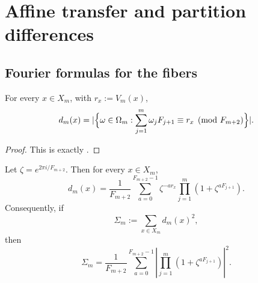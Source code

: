 \section{Affine transfer and partition differences}\label{sec:residue-affine}

\subsection{Fourier formulas for the fibers}

\begin{theorem}
\label{thm:residue-fibers}
For every \(x\in X_m\), with \(r_x:=V_m(x)\),
\[
  d_m(x)
  =
  \lvert \Bigl\{\omega\in\Omega_m:
  \sum_{j=1}^m\omega_jF_{j+1}\equiv r_x \pmod{F_{m+2}}\Bigr\} \rvert.
\]
\end{theorem}

\begin{proof}
This is exactly .
\end{proof}

\begin{theorem}
\label{thm:fourier-inversion}
Let \(\zeta=e^{2\pi i/F_{m+2}}\).  Then for every \(x\in X_m\),
\[
  d_m(x)=\frac{1}{F_{m+2}}
  \sum_{a=0}^{F_{m+2}-1}
  \zeta^{-ar_x}\prod_{j=1}^m(1+\zeta^{aF_{j+1}}).
\]
Consequently, if
\[
  \Sigma_m:=\sum_{x\in X_m}d_m(x)^2,
\]
then
\[
  \Sigma_m=
  \frac{1}{F_{m+2}}
  \sum_{a=0}^{F_{m+2}-1}
  \left|
    \prod_{j=1}^m(1+\zeta^{aF_{j+1}})
  \right|^2.
\]
\end{theorem}

